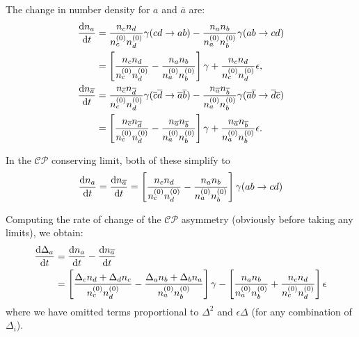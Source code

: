 \documentclass{scrartcl}
\begin{document}
The change in number density for \(a\) and \(\overline{a}\) are:
\begin{align}
  \frac{\mathop{}\!\mathrm{d}{n_a}}{\mathop{}\!\mathrm{d}{t}}
   & = \frac{n_c n_d}{n_c^{(0)} n_d^{(0)}} \gamma(cd \to ab)
  - \frac{n_a n_b}{n_a^{(0)} n_b^{(0)}} \gamma(ab \to cd)                                                                      \\
   & = \left[
  \frac{n_c n_d}{n_c^{(0)} n_d^{(0)}}
  - \frac{n_a n_b}{n_a^{(0)} n_b^{(0)}}
  \right] \gamma
  + \frac{n_c n_d}{n_c^{(0)} n_d^{(0)}} \epsilon,                                                                              \\
  \frac{\mathop{}\!\mathrm{d}{n_{\overline a}}}{\mathop{}\!\mathrm{d}{t}}
   & = \frac{n_{\overline c} n_{\overline d}}{n_c^{(0)} n_d^{(0)}} \gamma(\overline c \overline d \to \overline a \overline b)
  - \frac{n_{\overline a} n_{\overline b}}{n_a^{(0)} n_b^{(0)}} \gamma(\overline a \overline b \to \overline d \overline c)    \\
   & = \left[
  \frac{n_{\overline c} n_{\overline d}}{n_c^{(0)} n_d^{(0)}}
  - \frac{n_{\overline a} n_{\overline b}}{n_a^{(0)} n_b^{(0)}}
  \right] \gamma
  + \frac{n_{\overline a} n_{\overline b}}{n_a^{(0)} n_b^{(0)}} \epsilon.                                                      \\
\end{align}

In the \(\mathcal{CP}\) conserving limit, both of these simplify to
\begin{equation}
  \frac{\mathop{}\!\mathrm{d}{n_a}}{\mathop{}\!\mathrm{d}{t}} = \frac{\mathop{}\!\mathrm{d}{n_{\overline a}}}{\mathop{}\!\mathrm{d}{t}}
  = \left[ \frac{n_c n_d}{n_c^{(0)} n_d^{(0)}}  - \frac{n_a n_b}{n_a^{(0)} n_b^{(0)}} \right] \gamma(ab \to cd)
\end{equation}

Computing the rate of change of the \(\mathcal{CP}\) asymmetry (obviously before
taking any limits), we obtain:
\begin{equation}
  \begin{aligned}
    \frac{\mathop{}\!\mathrm{d}{\Delta_a}}{\mathop{}\!\mathrm{d}{t}}
     & = \frac{\mathop{}\!\mathrm{d}{n_a}}{\mathop{}\!\mathrm{d}{t}} - \frac{\mathop{}\!\mathrm{d}{n_{\overline a}}}{\mathop{}\!\mathrm{d}{t}} \\
     & = \left[
    \frac{\Delta_c n_d + \Delta_d n_c}{n_c^{(0)} n_d^{(0)}}
    - \frac{\Delta_a n_b + \Delta_b n_a}{n_a^{(0)} n_b^{(0)}} \right] \gamma
    - \left[
    \frac{n_a n_b}{n_a^{(0)} n_b^{(0)}} + \frac{n_c n_d}{n_c^{(0)} n_d^{(0)}}
    \right] \epsilon
  \end{aligned}
\end{equation}
where we have omitted terms proportional to \(\Delta^2\) and \(\epsilon \Delta\)
(for any combination of \(\Delta_i\)).
\end{document}
